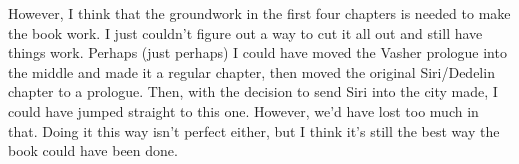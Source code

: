 However, I think that the groundwork in the first four chapters is needed to make the book work. I just couldn’t figure out a way to cut it all out and still have things work. Perhaps (just perhaps) I could have moved the Vasher prologue into the middle and made it a regular chapter, then moved the original Siri/Dedelin chapter to a prologue. Then, with the decision to send Siri into the city made, I could have jumped straight to this one. However, we’d have lost too much in that. Doing it this way isn’t perfect either, but I think it’s still the best way the book could have been done.



